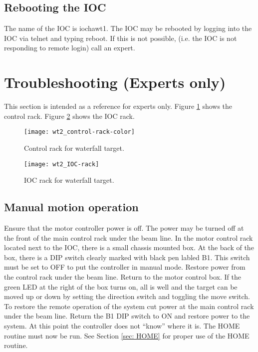 \subsection{Rebooting the IOC}

The name of the IOC is iochawt1. The IOC may be rebooted by logging
into the IOC via telnet and typing reboot. If this is not possible,
(i.e. the IOC is not responding to remote login) call an expert.


\section{Troubleshooting (Experts only)}

This section is intended as a reference for experts only. Figure \ref{fig: wt_control rack}
shows the control rack. Figure \ref{fig: wt_IOC-rack} shows the IOC
rack.

%
\begin{figure}
\begin{center}\texttt{[image: wt2\_control-rack-color]}\end{center}


\caption{Control rack for waterfall target.\label{fig: wt_control rack}}
\end{figure}
%
\begin{figure}
\begin{center}\texttt{[image: wt2\_IOC-rack]}\end{center}


\caption{IOC rack for waterfall target.\label{fig: wt_IOC-rack}}
\end{figure}



\subsection{Manual motion operation\label{sec: Manual}}

Ensure that the motor controller power is off. The power may be turned
off at the front of the main control rack under the beam line. In
the motor control rack located next to the IOC, there is a small chassis
mounted box. At the back of the box, there is a DIP switch clearly
marked with black pen labled B1. This switch must be set to OFF to
put the controller in manual mode. Restore power from the control
rack under the beam line. Return to the motor control box. If the
green LED at the right of the box turns on, all is well and the target
can be moved up or down by setting the direction switch and toggling
the move switch. To restore the remote operation of the system cut
power at the main control rack under the beam line. Return the B1
DIP switch to ON and restore power to the system. At this point the
controller does not {}``know'' where it is. The HOME routine must
now be run. See Section \ref{sec: HOME} for proper use of the HOME
routine.


